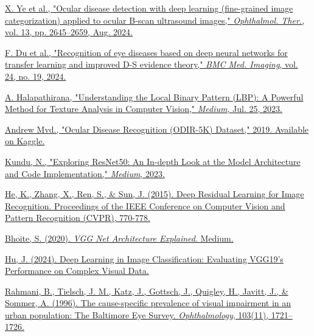 \documentclass{ijclclp}
\begin{document}
\begin{itemize}
\href{https://doi.org/10.1007/s40123-024-01009-7}
{X. Ye et al., "Ocular disease detection with deep learning (fine-grained image categorization) applied to ocular B-scan ultrasound images," \textit{Ophthalmol. Ther.}, vol. 13, pp. 2645–2659, Aug. 2024.}

\href{https://doi.org/10.1186/s12880-023-01176-2}
{F. Du et al., "Recognition of eye diseases based on deep neural networks for transfer learning and improved D-S evidence theory," \textit{BMC Med. Imaging}, vol. 24, no. 19, 2024.}

\href{https://aihalapathirana.medium.com/understanding-the-local-binary-pattern-lbp-a-powerful-method-for-texture-analysis-in-computer-4fb55b3ed8b8}
{A. Halapathirana, "Understanding the Local Binary Pattern (LBP): A Powerful Method for Texture Analysis in Computer Vision," \textit{Medium}, Jul. 25, 2023.}

\href{https://www.kaggle.com/datasets/andrewmvd/ocular-disease-recognition-odir5k}
{Andrew Mvd., "Ocular Disease Recognition (ODIR-5K) Dataset," 2019. Available on Kaggle.}

\href{https://medium.com/@nitishkundu1993/exploring-resnet50-an-in-depth-look-at-the-model-architecture-and-code-implementation-d8d8fa67e46f}
{Kundu, N., "Exploring ResNet50: An In-depth Look at the Model Architecture and Code Implementation," \textit{Medium}, 2023.}

\href{https://doi.org/10.1109/CVPR.2016.90}{
He, K., Zhang, X., Ren, S., \& Sun, J. (2015). Deep Residual Learning for Image Recognition. Proceedings of the IEEE Conference on Computer Vision and Pattern Recognition (CVPR), 770-778.}

\href{https://medium.com/@siddheshb008/vgg-net-architecture-explained-71179310050f}{
Bhoite, S. (2020). \textit{VGG Net Architecture Explained}. Medium.}

\href{https://example.com/deep-learning-vgg19}{
Hu, J. (2024). Deep Learning in Image Classification: Evaluating VGG19's Performance on Complex Visual Data.}

\href{https://doi.org/10.1016/S0161-6420(96)30435-1}{
Rahmani, B., Tielsch, J. M., Katz, J., Gottsch, J., Quigley, H., Javitt, J., \& Sommer, A. (1996). The cause-specific prevalence of visual impairment in an urban population: The Baltimore Eye Survey. \textit{Ophthalmology}, 103(11), 1721–1726.}



\end{itemize}
\end{document}
